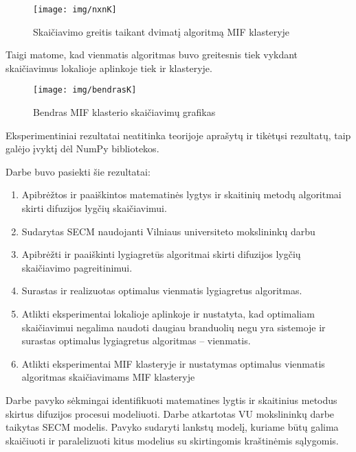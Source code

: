 \documentclass{VUMIFPSkursinis}
\begin{document}
\begin{figure}[H]
\centering
\texttt{[image: img/nxnK]}
\caption{Skaičiavimo greitis taikant dvimatį algoritmą MIF klasteryje} %
\label{img:text}
\end{figure}

Taigi matome, kad vienmatis algoritmas buvo greitesnis tiek vykdant skaičiavimus lokalioje aplinkoje tiek ir klasteryje.


\begin{figure}[H]
\centering
\texttt{[image: img/bendrasK]}
\caption{Bendras MIF klasterio skaičiavimų grafikas} %
\label{img:text}
\end{figure}

Eksperimentiniai rezultatai neatitinka teorijoje aprašytų ir tikėtųsi rezultatų, taip galėjo įvyktį dėl NumPy bibliotekos.

\pagebreak


Darbe buvo pasiekti šie rezultatai:
\begin{enumerate}
\item{Apibrėžtos ir paaiškintos matematinės lygtys ir skaitinių metodų algoritmai skirti difuzijos lygčių skaičiavimui.}
\item{Sudarytas SECM naudojanti Vilniaus universiteto mokslininkų darbu \cite{Astr}}
\item{Apibrėžti ir paaiškinti lygiagretūs algoritmai skirti difuzijos lygčių skaičiavimo pagreitinimui.}
\item{Surastas ir realizuotas optimalus vienmatis lygiagretus algoritmas.}
\item{Atlikti eksperimentai lokalioje aplinkoje ir nustatyta, kad optimaliam skaičiavimui negalima naudoti daugiau branduolių negu yra sistemoje ir surastas optimalus lygiagretus algoritmas – vienmatis.}
\item{Atlikti eksperimentai MIF klasteryje ir nustatymas optimalus vienmatis algoritmas skaičiavimams MIF klasteryje}
\end{enumerate}

\pagebreak


	Darbe pavyko sėkmingai identifikuoti matematines lygtis ir skaitinius metodus skirtus difuzijos procesui modeliuoti.
	Darbe atkartotas VU mokslininkų darbe\cite{Astr} taikytas SECM modelis.
	Pavyko sudaryti lankstų modelį, kuriame būtų galima skaičiuoti ir paralelizuoti kitus modelius su skirtingomis kraštinėmis sąlygomis.
	
\end{document}
